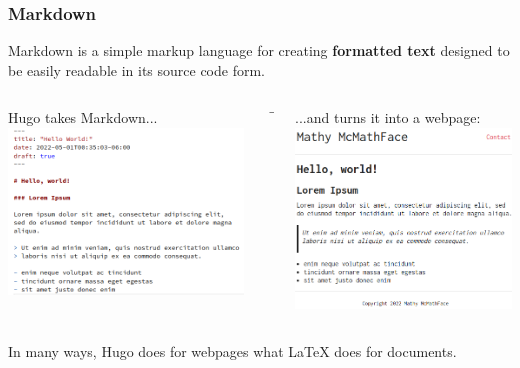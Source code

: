\begin{frame}
    \frametitle{Markdown}

    Markdown is a simple markup language for creating \textbf{formatted text} designed to be easily readable in
    its source code form.
    \medskip

    \pause
    \begin{columns}
        \begin{column}[T]{.45\textwidth}
            Hugo takes Markdown...\ \\
            \smallskip
            \includegraphics[width=\textwidth]{images/markdown.png}
        \end{column}
        \pause
        \begin{column}[c]{.1\textwidth}
            $$ \to $$
        \end{column}
        \begin{column}[T]{.45\textwidth}
            ...and turns it into a webpage:\ \\
            \smallskip
            \includegraphics[width=\textwidth]{images/rendered_markdown.png}
        \end{column}
    \end{columns}

    \pause
    \vfill

    In many ways, Hugo does for webpages what \LaTeX \: does for documents.
    
\end{frame}